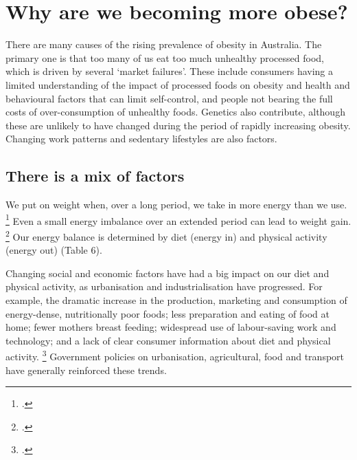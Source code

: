 \documentclass[embargoed]{grattan}
\begin{document}
\chapter{Why are we becoming more obese?}\label{why-are-we-becoming-more-obese}

There are many causes of the rising prevalence of obesity in Australia.
The primary one is that too many of us eat too much unhealthy processed food, which is driven by several `market failures'.
These include consumers having a limited understanding of the impact of processed foods on obesity and health and behavioural factors that can limit self-control, and people not bearing the full costs of over-consumption of unhealthy foods.
Genetics also contribute, although these are unlikely to have changed during the period of rapidly increasing obesity.
Changing work patterns and sedentary lifestyles are also factors.

\section{There is a mix of factors}\label{there-is-a-mix-of-factors}

We put on weight when, over a long period, we take in more energy than we use.%
\footcites{Organization2016ObesityoverweightFact}{Organisation2000Obesitypreventingmanaging}{Ebbeling2002Childhoodobesitypublic}{Swinburn2004Dietnutritionprevention}{Cutler2003WhyhaveAmericans}{Roberto2015Patchyprogressobesity} Even a small energy imbalance over an extended period can lead to weight gain.%
\footcites{Ebbeling2002Childhoodobesitypublic}{Cutler2003WhyhaveAmericans} Our energy balance is determined by diet (energy in) and physical activity (energy out) (Table 6).

Changing social and economic factors have had a big impact on our diet and physical activity, as urbanisation and industrialisation have progressed.
For example, the dramatic increase in the production, marketing and consumption of energy-dense, nutritionally poor foods; less preparation and eating of food at home; fewer mothers breast feeding; widespread use of labour-saving work and technology; and a lack of clear consumer information about diet and physical activity.%
\footcites{Livingston2012JAMAobesitytheme}{Ewart-Pierce2016WholeCommunityObesity}{Roberto2015Patchyprogressobesity}{Keith2006Putativecontributorssecular}{Wright2012Causesobesity}{Lakdawalla2009growthobesitytechnological}{Popkin2004nutritiontransitionworldwide}{Popkin2001nutritiontransitionobesity}{Karnani2016ObesityCrisisas}{Bray2004Consumptionhighfructose}{Organisation2000Obesitypreventingmanaging}{Swinburn2004Dietnutritionprevention} Government policies on urbanisation, agricultural, food and transport have generally reinforced these trends.
\end{document}
